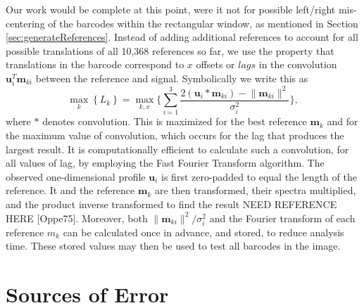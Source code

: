 Our work would be complete at this point, were it not for possible left/right mis-centering of the barcodes within the rectangular window, as mentioned in  Section \ref{sec:generateReferences}. Instead of adding  additional references to account for all possible translations of all 10,368 references so far, we use the property that translations in the barcode correspond to $x$ offsets or $lags$ in the convolution $\mathbf{u}_i ^T \mathbf{m}_{ki}$ between the reference and signal. Symbolically we write this as 
\begin{equation}
\max_k   \left\{ L_k \right\}  =  \max_{k,x} \Bigg\{ \sum_{i=1}^3 \frac{   2 (\mathbf{u}_i * \mathbf{m}_{ki}) - \lVert \mathbf{m}_{ki} \rVert^2   }{\sigma_i^2}  \Bigg\},
\end{equation}
where $*$ denotes convolution. This is maximized for the best reference $\mathbf{m}_k$ and for the maximum value of convolution, which occurs for the lag that produces the largest result.  It is computationally efficient to calculate such a convolution, for all values of lag, by employing the Fast Fourier Transform algorithm. The observed one-dimensional profile $\mathbf{u}_i$ is first zero-padded to equal the length of the reference. It and the reference $\mathbf{m}_k$ are then transformed, their spectra multiplied, and the product inverse transformed to find the result NEED REFERENCE HERE [Oppe75]. Moreover, both  $\lVert \mathbf{m}_{ki} \rVert^2 / \sigma_i^2$ and the Fourier transform of each reference $m_k$ can be calculated once in advance, and stored, to reduce analysis time. These stored values may then be used to test all barcodes in the image.  


\section{Sources of Error}

